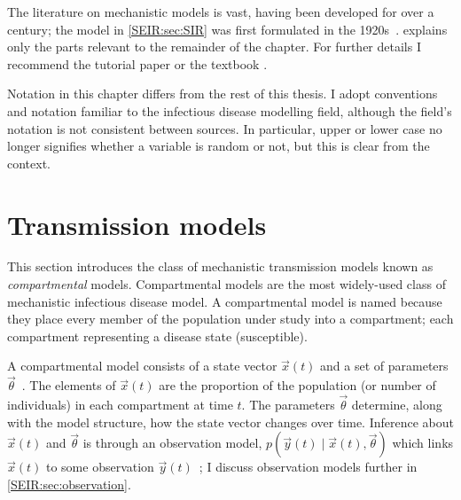 \documentclass[thesis.tex]{subfiles}
\begin{document}
The literature on mechanistic models is vast, having been developed for over a century; the model in \cref{SEIR:sec:SIR} was first formulated in the 1920s~\autocite{kermackContribution}.
 explains only the parts relevant to the remainder of the chapter.
For further details I recommend the tutorial paper \textcite{kretzschmarMathematical} or the textbook \textcite{keelingModeling}.

Notation in this chapter differs from the rest of this thesis.
I adopt conventions and notation familiar to the infectious disease modelling field, although the field's notation is not consistent between sources.
In particular, upper or lower case no longer signifies whether a variable is random or not, but this is clear from the context.

\section{Transmission models} \label{SEIR:sec:transmission-generic}

This section introduces the class of mechanistic transmission models known as \emph{compartmental} models.
Compartmental models are the most widely-used class of mechanistic infectious disease model.
A compartmental model is named because they place every member of the population under study into a compartment; each compartment representing a disease state (\eg susceptible).

A compartmental model consists of a state vector $\vec{x}(t)$ and a set of parameters $\vec{\theta}$~\autocite{birrellEvidence}.
The elements of $\vec{x}(t)$ are the proportion of the population (or number of individuals) in each compartment at time $t$.
The parameters $\vec{\theta}$ determine, along with the model structure, how the state vector changes over time.
Inference about $\vec{x}(t)$ and $\vec{\theta}$ is through an observation model, $p(\vec{y}(t) \mid \vec{x}(t), \vec{\theta})$ which links $\vec{x}(t)$ to some observation $\vec{y}(t)$~\autocite{birrellEvidence}; I discuss observation models further in \cref{SEIR:sec:observation}.
\end{document}
